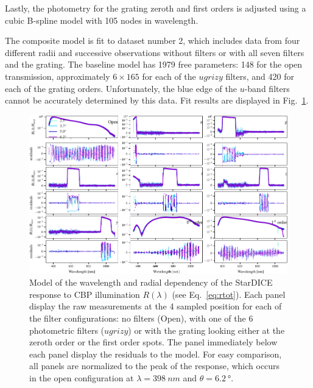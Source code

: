 Lastly, the photometry for the grating zeroth and first orders is
adjusted using a cubic B-spline model with \num{105} nodes in
wavelength.

The composite model is fit to dataset number 2, which includes data
from four different radii and successive observations without filters
or with all seven filters and the grating. The baseline model has
\num{1979} free parameters: \num{148} for the open transmission,
approximately $6\times165$ for each of the $ugrizy$ filters, and
\num{420} for each of the grating orders. Unfortunately, the blue edge
of the $u$-band filters cannot be accurately determined by this
data. Fit results are displayed in
Fig.~\ref{fig:lambdathetafitresults}.

\begin{figure}
  \centering
  \includegraphics[width=1\linewidth]{./fig/lambdathetafitresults.pdf}
  \caption{Model of the wavelength and radial dependency of the
    StarDICE response to CBP illumination $R(\lambda)$ (see
    Eq.~\ref{eq:rtot}). Each panel display the raw measurements at the
    4 sampled position for each of the filter configurations: no
    filters (Open), with one of the 6 photometric filters ($ugrizy$)
    or with the grating looking either at the zeroth order or the
    first order spots. The panel immediately below each panel display
    the residuals to the model. For easy comparison, all panels are
    normalized to the peak of the response, which occurs in the open
    configuration at $\lambda = \SI{398}{nm}$ and
    $\theta = \SI{6.2}{\degree}$.  }
  \label{fig:lambdathetafitresults}
\end{figure}


